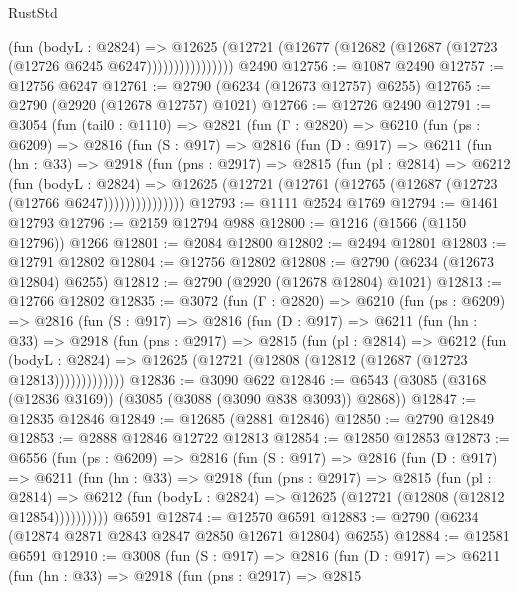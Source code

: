 \begin{lexlean}{RustStd}
\begin{coremodule}
                      (fun (bodyL : @2824) =>
                      @12625
                        (@12721 (@12677 (@12682 (@12687 (@12723 (@12726 @6245 @6247))))))))))))))))
    @2490
@12756 := @1087 @2490
@12757 := @12756 @6247
@12761 := @2790 (@6234 (@12673 @12757) @6255)
@12765 := @2790 (@2920 (@12678 @12757) @1021)
@12766 := @12726 @2490
@12791 := @3054
    (fun (tail0 : @1110) =>
    @2821
      (fun (Γ : @2820) =>
      @6210
        (fun (ps : @6209) =>
        @2816
          (fun (S : @917) =>
          @2816
            (fun (D : @917) =>
            @6211
              (fun (hn : @33) =>
              @2918
                (fun (pns : @2917) =>
                @2815
                  (fun (pl : @2814) =>
                  @6212
                    (fun (bodyL : @2824) =>
                    @12625 (@12721 (@12761 (@12765 (@12687 (@12723 (@12766 @6247)))))))))))))))
@12793 := @1111 @2524 @1769
@12794 := @1461 @12793
@12796 := @2159 @12794 @988
@12800 := @1216 (@1566 (@1150 @12796)) @1266
@12801 := @2084 @12800
@12802 := @2494 @12801
@12803 := @12791 @12802
@12804 := @12756 @12802
@12808 := @2790 (@6234 (@12673 @12804) @6255)
@12812 := @2790 (@2920 (@12678 @12804) @1021)
@12813 := @12766 @12802
@12835 := @3072
    (fun (Γ : @2820) =>
    @6210
      (fun (ps : @6209) =>
      @2816
        (fun (S : @917) =>
        @2816
          (fun (D : @917) =>
          @6211
            (fun (hn : @33) =>
            @2918
              (fun (pns : @2917) =>
              @2815
                (fun (pl : @2814) =>
                @6212
                  (fun (bodyL : @2824) =>
                  @12625 (@12721 (@12808 (@12812 (@12687 (@12723 @12813)))))))))))))
@12836 := @3090 @622
@12846 := @6543 (@3085 (@3168 (@12836 @3169)) (@3085 (@3088 (@3090 @838 @3093)) @2868))
@12847 := @12835 @12846
@12849 := @12685 (@2881 @12846)
@12850 := @2790 @12849
@12853 := @2888 @12846 @12722 @12813
@12854 := @12850 @12853
@12873 := @6556
    (fun (ps : @6209) =>
    @2816
      (fun (S : @917) =>
      @2816
        (fun (D : @917) =>
        @6211
          (fun (hn : @33) =>
          @2918
            (fun (pns : @2917) =>
            @2815
              (fun (pl : @2814) =>
              @6212 (fun (bodyL : @2824) => @12625 (@12721 (@12808 (@12812 @12854))))))))))
    @6591
@12874 := @12570 @6591
@12883 := @2790 (@6234 (@12874 @2871 @2843 @2847 @2850 @12671 @12804) @6255)
@12884 := @12581 @6591
@12910 := @3008
    (fun (S : @917) =>
    @2816
      (fun (D : @917) =>
      @6211
        (fun (hn : @33) =>
        @2918
          (fun (pns : @2917) =>
          @2815

\end{coremodule}
\end{lexlean}
